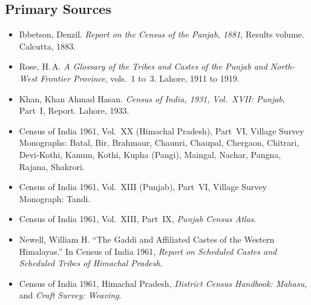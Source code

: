 \documentclass[11pt,a4paper]{article}
\begin{document}
\subsection*{Primary Sources}
\begin{itemize}
\item Ibbetson, Denzil. \emph{Report on the Census of the Panjab, 1881}, Results volume. Calcutta, 1883.
\item Rose, H.\,A. \emph{A Glossary of the Tribes and Castes of the Punjab and North-West Frontier Province}, vols.~1 to~3. Lahore, 1911 to 1919.
\item Khan, Khan Ahmad Hasan. \emph{Census of India, 1931, Vol.~XVII: Punjab}, Part~I, Report. Lahore, 1933.
\item Census of India 1961, Vol.~XX (Himachal Pradesh), Part~VI, Village Survey Monographs: Batal, Bir, Brahmaur, Chaunri, Chaupal, Chergaon, Chitrari, Devi-Kothi, Kanum, Kothi, Kupha (Pangi), Maingal, Nachar, Pangna, Rajana, Shakrori.
\item Census of India 1961, Vol.~XIII (Punjab), Part~VI, Village Survey Monograph: Tandi.
\item Census of India 1961, Vol.~XIII, Part~IX, \emph{Punjab Census Atlas}.
\item Newell, William H. \enquote{The Gaddi and Affiliated Castes of the Western Himalayas.} In Census of India 1961, \emph{Report on Scheduled Castes and Scheduled Tribes of Himachal Pradesh}.
\item Census of India 1961, Himachal Pradesh, \emph{District Census Handbook: Mahasu}, and \emph{Craft Survey: Weaving}.
\end{itemize}
\end{document}
